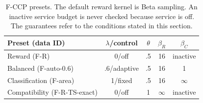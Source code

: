 \documentclass[11pt]{article}
\theoremstyle{remark}
\begin{document}
\begin{table}[t]
\centering\small
\caption{F-CCP presets. The default reward kernel is Beta sampling.
An inactive service budget is never checked because service is off.
The guarantees refer to the conditions stated in this section.}
\label{tab:fccp-modes}
\begin{tabular}{lcccc}
\toprule
Preset (data ID)&$\lambda$/control&$\theta$&$\beta_R$&$\beta_C$\\
\midrule
Reward (F-R)&0/off&.5&16&inactive\\
Balanced (F-auto-0.6)&.6/adaptive&.5&16&1\\
Classification (F-area)&1/fixed&.5&16&$\infty$\\
Compatibility (F-R-TS-exact)&0/off&1&$\infty$&inactive\\
\bottomrule
\end{tabular}
\end{table}
\end{document}
